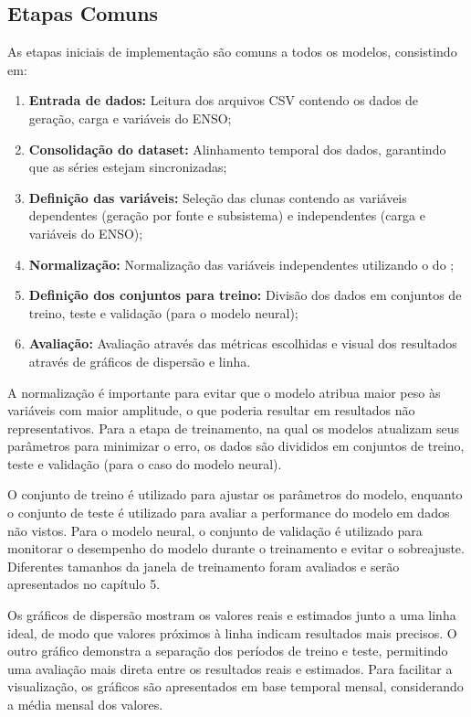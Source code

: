 \subsection{Etapas Comuns} %
As etapas iniciais de implementação são comuns a todos os modelos, consistindo em: 
\begin{enumerate}
    \item \textbf{Entrada de dados:} Leitura dos arquivos CSV contendo os dados de geração, carga e variáveis do ENSO;
    \item \textbf{Consolidação do dataset:} Alinhamento temporal dos dados, garantindo que as séries estejam sincronizadas;
    \item \textbf{Definição das variáveis:} Seleção das clunas contendo as variáveis dependentes (geração por fonte e subsistema) e 
independentes (carga e variáveis do ENSO);
    \item \textbf{Normalização:} Normalização das variáveis independentes utilizando o  do ;
    \item \textbf{Definição dos conjuntos para treino:} Divisão dos dados em conjuntos de treino, teste e validação (para o modelo neural);
    \item \textbf{Avaliação:} Avaliação através das métricas escolhidas e visual dos resultados através de gráficos de dispersão e linha.
\end{enumerate}

A normalização é importante para evitar que o modelo atribua maior peso às variáveis com maior amplitude,
o que poderia resultar em resultados não representativos. Para a etapa de treinamento, na qual os modelos atualizam seus parâmetros 
para minimizar o erro, os dados são divididos em conjuntos de treino, teste e validação (para o caso do modelo neural). 

O conjunto de treino é utilizado para ajustar os parâmetros 
do modelo, enquanto o conjunto de teste é utilizado para avaliar a performance do modelo em dados não vistos. Para o modelo neural, 
o conjunto de validação é utilizado para monitorar o desempenho do modelo durante o treinamento e evitar o sobreajuste. 
Diferentes tamanhos da janela de treinamento foram avaliados e serão apresentados no capítulo 5.

Os gráficos de dispersão mostram os valores reais e estimados junto a uma linha ideal, de modo que valores próximos à linha indicam 
resultados mais precisos. O outro gráfico demonstra a separação dos períodos de treino e teste, permitindo uma avaliação mais direta 
entre os resultados reais e estimados. Para facilitar a visualização, os gráficos são apresentados em base temporal mensal, 
considerando a média mensal dos valores.

